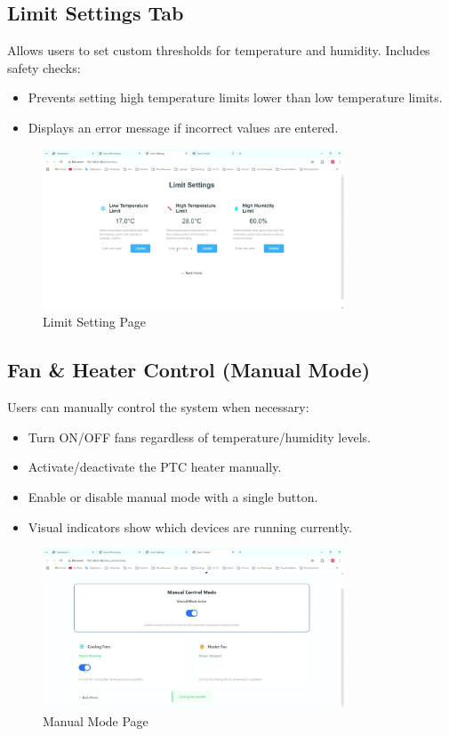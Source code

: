 \documentclass[a4paper]{scrartcl}
\begin{document}
\subsection{ Limit Settings Tab}
Allows users to set custom thresholds for temperature and humidity. Includes safety checks:
\begin{itemize}
    \item Prevents setting high temperature limits lower than low temperature limits.
    \item Displays an error message if incorrect values are entered.
\end{itemize}
\begin{figure}[H]
    \centering
    \includegraphics[width=0.8\textwidth]{images/LSP.jpg}
    \caption{Limit Setting Page}
\end{figure}



\subsection{ Fan \& Heater Control (Manual Mode)}
Users can manually control the system when necessary:
\begin{itemize}
    \item Turn ON/OFF fans regardless of temperature/humidity levels.
    \item Activate/deactivate the PTC heater manually.
    \item Enable or disable manual mode with a single button.
    \item Visual indicators show which devices are running currently.
\end{itemize}
\begin{figure}[H]
    \centering
    \includegraphics[width=0.8\textwidth]{images/MCP.jpg}
    \caption{Manual Mode Page}
\end{figure}
\end{document}
